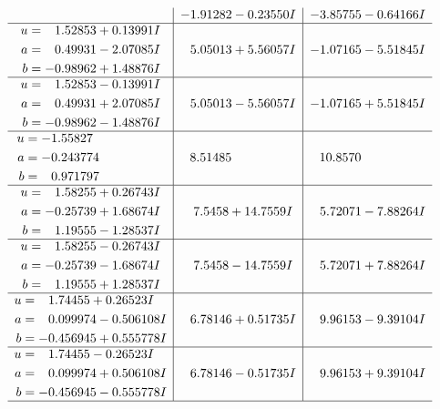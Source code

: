 \documentclass[1p]{elsarticle_modified}
\theoremstyle{definition}
\begin{document}
$$\begin{array}{c|c|c}
 & -1.91282 - 0.23550 I & -3.85755 - 0.64166 I \\ \hline\begin{aligned}
u &= \phantom{-}1.52853 + 0.13991 I \\
a &= \phantom{-}0.49931 - 2.07085 I \\
b &= -0.98962 + 1.48876 I\end{aligned}
 & \phantom{-}5.05013 + 5.56057 I & -1.07165 - 5.51845 I \\ \hline\begin{aligned}
u &= \phantom{-}1.52853 - 0.13991 I \\
a &= \phantom{-}0.49931 + 2.07085 I \\
b &= -0.98962 - 1.48876 I\end{aligned}
 & \phantom{-}5.05013 - 5.56057 I & -1.07165 + 5.51845 I \\ \hline\begin{aligned}
u &= -1.55827\phantom{ +0.000000I} \\
a &= -0.243774\phantom{ +0.000000I} \\
b &= \phantom{-}0.971797\phantom{ +0.000000I}\end{aligned}
 & \phantom{-}8.51485\phantom{ +0.000000I} & \phantom{-}10.8570\phantom{ +0.000000I} \\ \hline\begin{aligned}
u &= \phantom{-}1.58255 + 0.26743 I \\
a &= -0.25739 + 1.68674 I \\
b &= \phantom{-}1.19555 - 1.28537 I\end{aligned}
 & \phantom{-}7.5458 + 14.7559 I & \phantom{-}5.72071 - 7.88264 I \\ \hline\begin{aligned}
u &= \phantom{-}1.58255 - 0.26743 I \\
a &= -0.25739 - 1.68674 I \\
b &= \phantom{-}1.19555 + 1.28537 I\end{aligned}
 & \phantom{-}7.5458 - 14.7559 I & \phantom{-}5.72071 + 7.88264 I \\ \hline\begin{aligned}
u &= \phantom{-}1.74455 + 0.26523 I \\
a &= \phantom{-}0.099974 - 0.506108 I \\
b &= -0.456945 + 0.555778 I\end{aligned}
 & \phantom{-}6.78146 + 0.51735 I & \phantom{-}9.96153 - 9.39104 I \\ \hline\begin{aligned}
u &= \phantom{-}1.74455 - 0.26523 I \\
a &= \phantom{-}0.099974 + 0.506108 I \\
b &= -0.456945 - 0.555778 I\end{aligned}
 & \phantom{-}6.78146 - 0.51735 I & \phantom{-}9.96153 + 9.39104 I\\
 \hline 
 \end{array}$$\newpage\newpage\renewcommand{\arraystretch}{1}
\end{document}
